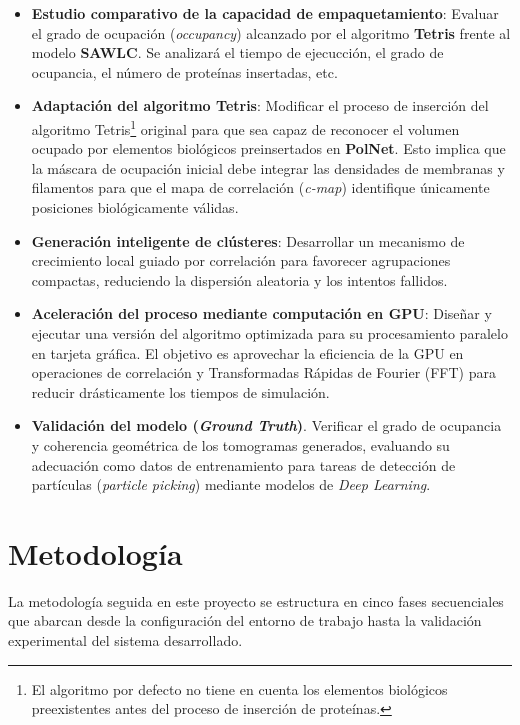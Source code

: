 \begin{itemize}
    \item \textbf{Estudio comparativo de la capacidad de empaquetamiento}: Evaluar el grado de ocupación (\textit{occupancy}) alcanzado por el algoritmo \textbf{Tetris} frente al modelo \textbf{SAWLC}. Se analizará el tiempo de ejecucción, el grado de ocupancia, el número de proteínas insertadas, etc.
    
    \item \textbf{Adaptación del algoritmo Tetris}: Modificar el proceso de inserción del algoritmo Tetris\footnote{El algoritmo por defecto no tiene en cuenta los elementos biológicos preexistentes antes del proceso de inserción de proteínas.} original para que sea capaz de reconocer el volumen ocupado por elementos biológicos preinsertados en \textbf{PolNet}. Esto implica que la máscara de ocupación inicial debe integrar las densidades de membranas y filamentos para que el mapa de correlación (\textit{c-map}) identifique únicamente posiciones biológicamente válidas.
    
   \item \textbf{Generación inteligente de clústeres}: Desarrollar un mecanismo de crecimiento local guiado por correlación para favorecer agrupaciones compactas, reduciendo la dispersión aleatoria y los intentos fallidos.
    
    \item \textbf{Aceleración del proceso mediante computación en GPU}: Diseñar y ejecutar una versión del algoritmo optimizada para su procesamiento paralelo en tarjeta gráfica. El objetivo es aprovechar la eficiencia de la GPU en operaciones de correlación y Transformadas Rápidas de Fourier (FFT) para reducir drásticamente los tiempos de simulación.
    
    \item \textbf{Validación del modelo (\textit{Ground Truth})}. Verificar el grado de ocupancia y coherencia geométrica de los tomogramas generados, evaluando su adecuación como datos de entrenamiento para tareas de detección de partículas (\textit{particle picking}) mediante modelos de \textit{Deep Learning}.
\end{itemize}


\section{Metodología}

La metodología seguida en este proyecto se estructura en cinco fases secuenciales que abarcan desde la configuración del entorno de trabajo hasta la validación experimental del sistema desarrollado.

